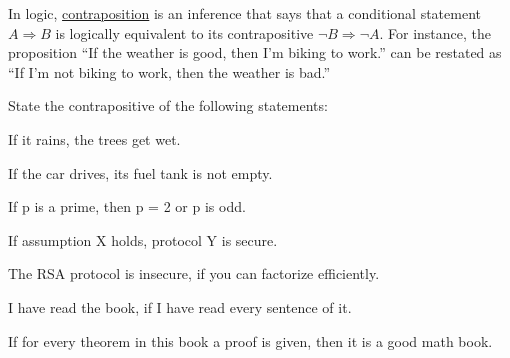 \documentclass[a4paper,10pt,landscape,twocolumn]{scrartcl}
\begin{document}
\begin{exercise}
In logic, \href{https://en.wikipedia.org/wiki/Contraposition}{contraposition} is an inference that says that a conditional statement $A \Rightarrow B$ is logically equivalent to its contrapositive $\neg B \Rightarrow \neg A$. For instance, the proposition ``If the weather is good, then I'm biking to work.'' can be restated as ``If I'm not biking to work, then the weather is bad.''

State the contrapositive of the following statements:
\begin{subex}
If it rains, the trees get wet.
\end{subex}
\begin{subex}
If the car drives, its fuel tank is not empty.
\end{subex}
\begin{subex}
If p is a prime, then p = 2 or p is odd.
\end{subex}
\begin{subex}
If assumption X holds, protocol Y is secure.
\end{subex}
\begin{subex}
The RSA protocol is insecure, if you can factorize efficiently.
\end{subex}
\begin{subex}
I have read the book, if I have read every sentence of it.
\end{subex}
\begin{subex}
If for every theorem in this book a proof is given, then it is a
good math book.
\end{subex}
\end{exercise}
\end{document}
